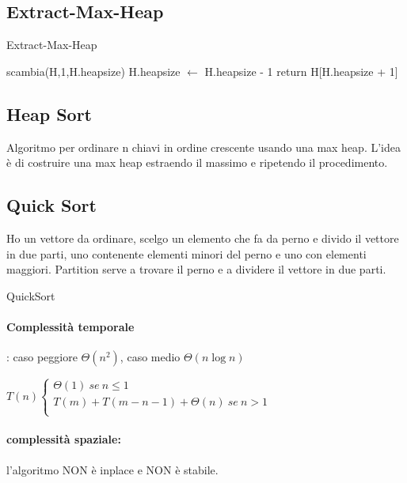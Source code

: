 \documentclass{article}
\begin{document}
\hypertarget{extractmaxheap}{}\subsection{Extract-Max-Heap} %

\begin{algorithm}[H]
\caption{Extract-Max-Heap}
scambia(H,1,H.heapsize)\;
H.heapsize $\leftarrow$ H.heapsize - 1\;
return H[H.heapsize + 1]\;
\end{algorithm}
    
\hypertarget{heapsort}{}\subsection{Heap Sort} %
Algoritmo per ordinare n chiavi in ordine crescente usando una max heap. L'idea è di costruire una max heap estraendo il massimo e ripetendo il procedimento.


\hypertarget{quicksort}{}\subsection{Quick Sort} %
Ho un vettore da ordinare, scelgo un elemento che fa da perno e divido il vettore in due parti, uno contenente 
elementi minori del perno e uno con elementi maggiori. Partition serve a trovare il perno e a dividere il vettore in due parti.

\begin{algorithm}[H]
\caption{QuickSort}
\end{algorithm}

\paragraph{Complessità temporale}: caso peggiore $\Theta(n^2)$, caso medio $\Theta(n \log n)$

$T(n)\begin{cases}
    \Theta(1) \ se \ n \leq 1\\
    T(m) + T(m-n-1) + \Theta(n) \ se \ n > 1\\
\end{cases}$

\paragraph{complessità spaziale:} l'algoritmo NON è inplace e NON è stabile.
\end{document}
